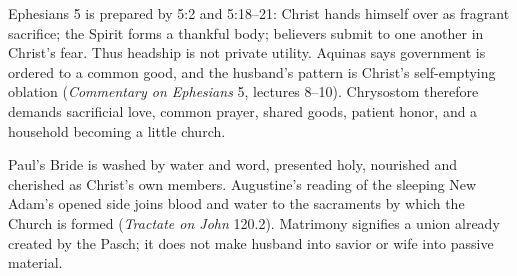 Ephesians 5 is prepared by 5:2 and 5:18--21: Christ hands himself over as fragrant sacrifice; the Spirit forms a thankful body; believers submit to one another in Christ's fear. Thus headship is not private utility. Aquinas says government is ordered to a common good, and the husband's pattern is Christ's self-emptying oblation (\emph{Commentary on Ephesians} 5, lectures 8--10). Chrysostom therefore demands sacrificial love, common prayer, shared goods, patient honor, and a household becoming a little church.

Paul's Bride is washed by water and word, presented holy, nourished and cherished as Christ's own members. Augustine's reading of the sleeping New Adam's opened side joins blood and water to the sacraments by which the Church is formed (\emph{Tractate on John} 120.2). Matrimony signifies a union already created by the Pasch; it does not make husband into savior or wife into passive material.
